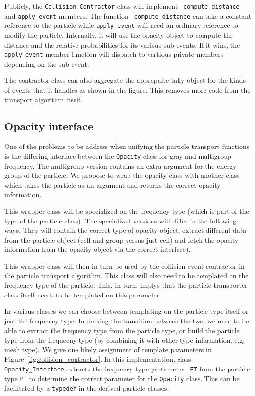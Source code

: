 \documentclass[memo]{ResearchNote}
\begin{document}
Publicly, the  {\tt  Collision\_Contractor}  class will implement  {\tt
  compute\_distance} and  {\tt apply\_event} members.  The function {\tt
  compute\_distance} can take    a constant reference to  the  particle
while {\tt apply\_event} will need an ordinary  reference to modify the
particle.  Internally,  it will use  the opacity object to compute the
distance and the  relative probabilities for  its various sub-events. 
If it wins, the {\tt apply\_event} member function will dispatch to
vartious private members depending on the sub-event.

The contractor class can also aggregate the appropaite tally object
for the kinds of events that it handles as shown in the figure. This
removes more code from the transport algorithm itself.

\subsection{Opacity interface}

One of the problems to be address when unifying the particle transport
functions is the differing interface between the {\tt Opacity} class
for gray and multigroup frequency.  The multigroup version contains an
extra argument for the energy group of the particle. We propose to
wrap the opacity class with another class which takes the particle as
an argument and returns the correct opacity information.

This wrapper class will be specialized on the frequency type (which is
part of the type of the particle class). The specialized versions will
differ in the following ways: They will contain the correct type of
opacity object, extract different data from the particle object (cell
and group versus just cell) and fetch the opacity information from the
opacity object via the correct interface).

This wrapper class will then in turn be used by the collision event
contractor in the particle transport algorithm. This class will also
need to be templated on the frequency type of the particle. This, in
turn, implys that the particle transporter class itself needs to be
templated on this parameter.

In various classes we can choose between templating on the particle
type itself or just the frequency type. In making the transition
between the two, we need to be able to extract the frequency type from
the particle type, or build the particle type from the frequecny type
(by combining it with other type information, e.g. mesh type). We give
one likely assignment of template parameters in
Figure~\ref{fig:collision_contractor}. In this implementation, class
{\tt Opacity\_Interface} extracts the frequency type partameter {\tt
  FT} from the particle type {\tt PT} to determine the correct
parameter for the {\tt Opacity} class. This can be facilitated by a
{\tt typedef} in the derived particle classes.
\end{document}
